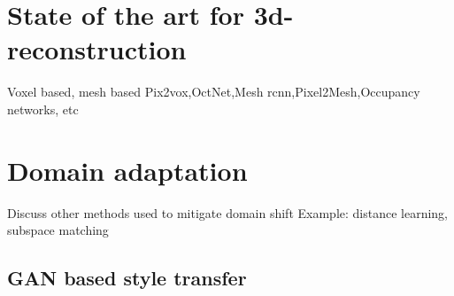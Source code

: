 \section{State of the art for 3d-reconstruction}\label{ss:state_of_the_art}
Voxel based, mesh based
Pix2vox,OctNet,Mesh rcnn,Pixel2Mesh,Occupancy networks, etc

\section{Domain adaptation}\label{ss:domain_adaptation}
Discuss other methods used to mitigate domain shift
Example: distance learning, subspace matching

\subsection{GAN based style transfer}\label{ss:gan_based_styletransfer}

